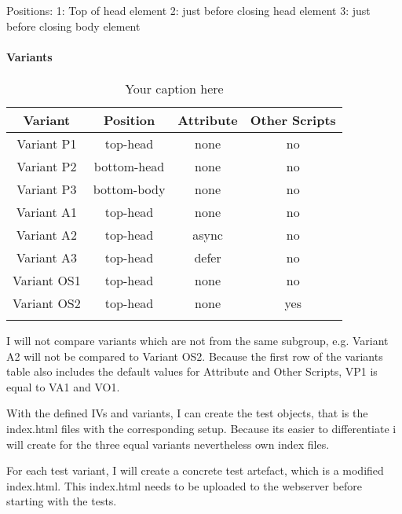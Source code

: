 Positions:
1: Top of head element
2: just before closing head element
3: just before closing body element




\paragraph{Variants}

\begin{center}
	\begin{longtable}{ |c|c|c|c|  }
	\hline
	Variant & Position & Attribute & Other Scripts \\
	\hline
	Variant P1 & top-head & \cellcolor{lightgrey} none & \cellcolor{lightgrey} no \\
	   Variant P2 & bottom-head & \cellcolor{lightgrey} none & \cellcolor{lightgrey} no \\
	   Variant P3 & bottom-body & \cellcolor{lightgrey} none & \cellcolor{lightgrey} no \\
	  \hline
	   Variant A1 & \cellcolor{lightgrey} top-head & none & \cellcolor{lightgrey} no \\
	   Variant A2 & \cellcolor{lightgrey} top-head & async & \cellcolor{lightgrey} no \\
	   Variant A3 & \cellcolor{lightgrey} top-head & defer & \cellcolor{lightgrey} no \\
	  \hline
	  Variant OS1 & \cellcolor{lightgrey} top-head & \cellcolor{lightgrey} none & no \\
	  Variant OS2 & \cellcolor{lightgrey} top-head & \cellcolor{lightgrey} none & yes \\
	  \hline
	\caption{Your caption here} %
	\label{tab:myfirstlongtable}
	\end{longtable}
\end{center}


I will not compare variants which are not from the same subgroup, e.g. Variant A2 will not be compared to Variant OS2.
Because the first row of the variants table also includes the default values for Attribute and Other Scripts, VP1 is equal to VA1 and VO1.

With the defined IVs and variants, I can create the test objects, that is the index.html files with the corresponding setup.
Because its easier to differentiate i will create for the three equal variants nevertheless own index files.

For each test variant, I will create a concrete test artefact, which is a modified index.html.
This index.html needs to be uploaded to the webserver before starting with the tests.

